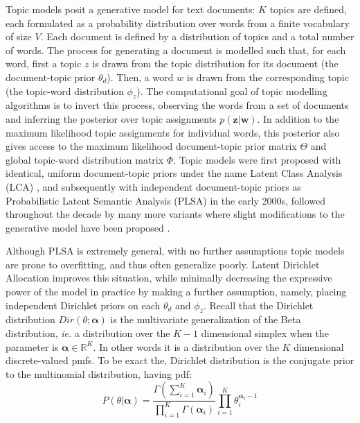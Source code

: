Topic models posit a generative model for text documents: $K$ topics are defined, each formulated as a probability distribution over words from a finite vocabulary of size $V$. Each document is defined by a distribution of topics and a total number of words. The process for generating a document is modelled such that, for each word, first a topic $z$ is drawn from the topic distribution for its document (the document-topic prior $\theta_d$). Then, a word $w$ is drawn from the corresponding topic (the topic-word distribution $\phi_{z}$). The computational goal of topic modelling algorithms is to invert this process, observing the words from a set of documents and inferring the posterior over topic assignments $p(\boldsymbol{z} | \boldsymbol{w})$. In addition to the maximum likelihood topic assignments for individual words, this posterior also gives access to the maximum likelihood document-topic prior matrix $\Theta$ and global topic-word distribution matrix $\Phi$. Topic models were first proposed with identical, uniform document-topic priors under the name Latent Class Analysis (LCA) \citep{Hofmann2000}, and subsequently with independent document-topic priors as Probabilistic Latent Semantic Analysis (PLSA) \citep{Hofmann2001} in the early 2000s, followed throughout the decade by many more variants where slight modifications to the generative model have been proposed \citep{Blei2010}.

Although PLSA is extremely general, with no further assumptions topic models are prone to overfitting, and thus often generalize poorly.
Latent Dirichlet Allocation improves this situation, while minimally decreasing the expressive power of the model in practice by making a further assumption, namely, placing independent Dirichlet priors on each $\theta_d$ and $\phi_z$. Recall that the Dirichlet distribution $Dir(\theta; \boldsymbol{\alpha})$ is the multivariate generalization of the Beta distribution, \emph{ie.} a distribution over the $K-1$ dimensional simplex when the parameter is $\boldsymbol{\alpha} \in \mathbb{R}^K$. In other words it is a distribution over the $K$ dimensional discrete-valued pmfs. To be exact the, Dirichlet distribution is the conjugate prior to the multinomial distribution, having pdf:
\begin{equation}
P(\theta|\boldsymbol{\alpha}) = \frac{\Gamma(\sum_{i=1}^{K} \boldsymbol{\alpha}_i)}{\prod_{i=1}^{K} \Gamma(\boldsymbol{\alpha}_i)} \prod_{i=1}^{K} \theta_i^{\boldsymbol{\alpha}_i -1}
\end{equation}

